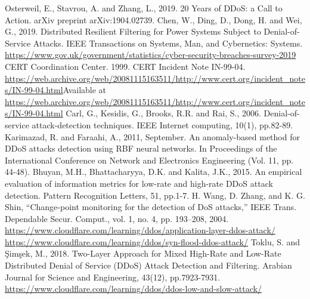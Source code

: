\documentclass[conference, a4paper]{IEEEtran}
\begin{document}
\begin{thebibliography}{00}
    Osterweil, E., Stavrou, A. and Zhang, L., 2019. 20 Years of DDoS: a Call to Action. arXiv preprint arXiv:1904.02739.
    Chen, W., Ding, D., Dong, H. and Wei, G., 2019. Distributed Resilient Filtering for Power Systems Subject to Denial-of-Service Attacks. IEEE Transactions on Systems, Man, and Cybernetics: Systems.
    \url{https://www.gov.uk/government/statistics/cyber-security-breaches-survey-2019}
    CERT Coordination Center. 1999. CERT Incident Note IN-99-04. \url{https://web.archive.org/web/20081115163511/http://www.cert.org/incident_notes/IN-99-04.html}Available at \url{https://web.archive.org/web/20081115163511/http://www.cert.org/incident_notes/IN-99-04.html}
    Carl, G., Kesidis, G., Brooks, R.R. and Rai, S., 2006. Denial-of-service attack-detection techniques. IEEE Internet computing, 10(1), pp.82-89.
    Karimazad, R. and Faraahi, A., 2011, September. An anomaly-based method for DDoS attacks detection using RBF neural networks. In Proceedings of the International Conference on Network and Electronics Engineering (Vol. 11, pp. 44-48).
    Bhuyan, M.H., Bhattacharyya, D.K. and Kalita, J.K., 2015. An empirical evaluation of information metrics for low-rate and high-rate DDoS attack detection. Pattern Recognition Letters, 51, pp.1-7.
    H. Wang, D. Zhang, and K. G. Shin, “Change-point monitoring for the detection of DoS attacks,” IEEE Trans. Dependable Secur. Comput., vol. 1, no. 4, pp. 193–208, 2004.
    \url{https://www.cloudflare.com/learning/ddos/application-layer-ddos-attack/}
    \url{https://www.cloudflare.com/learning/ddos/syn-flood-ddos-attack/}
    Toklu, S. and Şimşek, M., 2018. Two-Layer Approach for Mixed High-Rate and Low-Rate Distributed Denial of Service (DDoS) Attack Detection and Filtering. Arabian Journal for Science and Engineering, 43(12), pp.7923-7931.
    \url{https://www.cloudflare.com/learning/ddos/ddos-low-and-slow-attack/}
\end{thebibliography}

\vspace{12pt}
\end{document}
